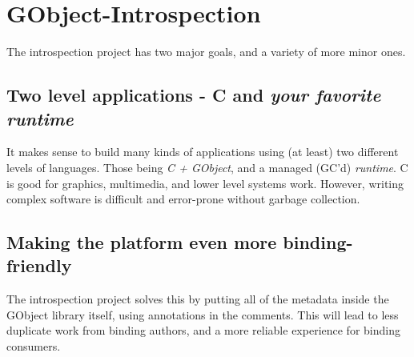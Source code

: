 
\section[GObject-Introspection]{GObject-Introspection\cite{website:introspection}}\label{sec:g-i}

The introspection project has two major goals, and a variety of more minor ones.

\subsection{Two level applications - C and \emph{your favorite runtime}}

It makes sense to build many kinds of applications using (at least) two different levels of languages. Those being \emph{C + GObject}, and a managed (GC'd) \emph{runtime}. C is good for graphics, multimedia, and lower level systems work. However, writing complex software is difficult and error-prone without garbage collection.

\subsection{Making the platform even more binding-friendly}

The introspection project solves this by putting all of the metadata inside the GObject library itself, using annotations in the comments. This will lead to less duplicate work from binding authors, and a more reliable experience for binding consumers.
